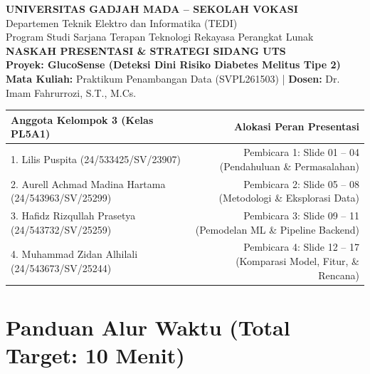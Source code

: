 \documentclass[11pt,a4paper]{article}
\begin{document}
\begin{center}
    {\large \textbf{UNIVERSITAS GADJAH MADA -- SEKOLAH VOKASI}}\\[0.2cm]
    {\normalsize Departemen Teknik Elektro dan Informatika (TEDI)}\\[0.1cm]
    {\normalsize Program Studi Sarjana Terapan Teknologi Rekayasa Perangkat Lunak}\\[0.6cm]

    {\LARGE \textbf{\color{primaryblue}NASKAH PRESENTASI \& STRATEGI SIDANG UTS}}\\[0.3cm]
    {\Large \textbf{Proyek: GlucoSense (Deteksi Dini Risiko Diabetes Melitus Tipe 2)}}\\[0.2cm]
    {\normalsize \textbf{Mata Kuliah:} Praktikum Penambangan Data (SVPL261503) | \textbf{Dosen:} Dr. Imam Fahrurrozi, S.T., M.Cs.}\\[0.5cm]
\end{center}

\noindent\begin{tabularx}{\textwidth}{@{}X r@{}}
    \toprule
    \textbf{Anggota Kelompok 3 (Kelas PL5A1)} & \textbf{Alokasi Peran Presentasi} \\
    \midrule
    1. Lilis Puspita (24/533425/SV/23907) & Pembicara 1: Slide 01 -- 04 (Pendahuluan \& Permasalahan) \\
    2. Aurell Achmad Madina Hartama (24/543963/SV/25299) & Pembicara 2: Slide 05 -- 08 (Metodologi \& Eksplorasi Data) \\
    3. Hafidz Rizqullah Prasetya (24/543732/SV/25259) & Pembicara 3: Slide 09 -- 11 (Pemodelan ML \& Pipeline Backend) \\
    4. Muhammad Zidan Alhilali (24/543673/SV/25244) & Pembicara 4: Slide 12 -- 17 (Komparasi Model, Fitur, \& Rencana) \\
    \bottomrule
\end{tabularx}

\vspace{0.4cm}

\section{Panduan Alur Waktu (Total Target: 10 Menit)}
\end{document}
